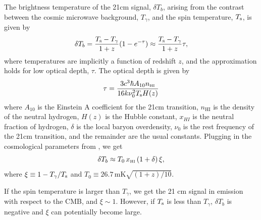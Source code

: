 \documentclass[twocolumn,numberedappendix]{emulateapj} \shorttitle{New Limits on the 21 cm Power Spectrum at $z=8.4$}
\newcommand{\Tspin}{T_{\rm s}}
\newcommand{\Tcmb}{T_\gamma}
\begin{document}
The brightness temperature of the 21cm signal, $\delta{T_{b}}$, arising from the
contrast between the cosmic
microwave background, $\Tcmb$, and the spin temperature, $\Tspin$, is given
by 
\begin{equation}\label{eqn:tb}
    \delta{T_{b}} = \frac{\Tspin - \Tcmb}{1+z}(1-e^{-\tau})
\approx \frac{\Tspin - \Tcmb}{1+z}\tau,
\end{equation}
where temperatures are implicitly a function of redshift $z$, and
the approximation holds for low optical depth, $\tau$. 
The optical depth is given by \citep{zaldarriaga_et_al2004}
\begin{equation}\label{eqn:tau}
    \tau = \frac{3c^3\hbar A_{10} n_{\text{\tiny{HI}}}}{16k\nu_0^2\Tspin H(z)}
\end{equation}
where $A_{10}$ is the Einstein A coefficient for the 21cm transition,
$n_{\text{HI}}$ is the density of the neutral hydrogen, $H(z)$ is the Hubble
constant, $x_{HI}$ is the neutral fraction of hydrogen, $\delta$ is the local
baryon overdensity, $\nu_0$ is the rest frequency of the 21cm transition, and 
the remainder are the usual constants.
Plugging in the cosmological parameters from \citet{planck_et_al2015}, 
we get 
\begin{equation}\label{eqn:final_tb}
    \delta{T_{b}} \approx T_{0}\,x_{\text{\tiny{HI}}}\,(1+\delta)\, \xi ,
\end{equation}
where $\xi\equiv1-\Tcmb/\Tspin$ and $T_0\equiv26.7 \,
\text{mK} \sqrt{(1+z)/10}$.

If the spin temperature is larger than $\Tcmb$, we get the 21 cm signal in
emission with respect to the CMB, and $\xi\sim1$. However, if $\Tspin$ is less than $\Tcmb$,
$\delta T_b$ is negative and $\xi$ can potentially become large.
\end{document}
